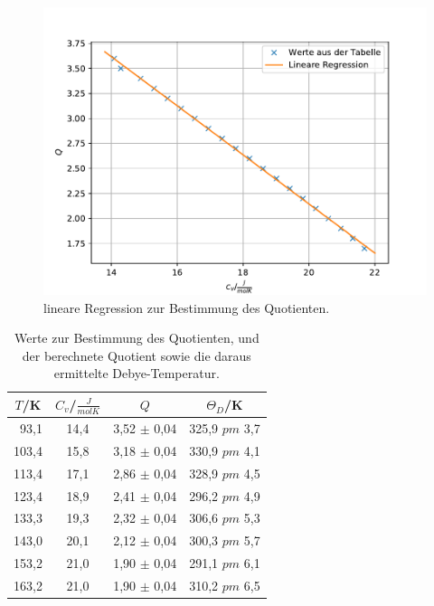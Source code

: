 \begin{figure}
  \centering
  \includegraphics{Q.pdf}
  \caption{lineare Regression zur Bestimmung des Quotienten.}
  \label{fig:Q}
\end{figure}
\FloatBarrier

\begin{table}
    \centering
    \caption{Werte zur Bestimmung des Quotienten, und der berechnete Quotient sowie die daraus ermittelte Debye-Temperatur.}
    \label{TabTd}
    \begin{tabular}{S S S[table-format=2.2] S } %
      \toprule
       {$T$/K} & {$C_{\si{v}}$/$\frac{\si{J}}{\si{molK}}$} & {$Q$} & {$\Theta_{\si{D}}$/K} \\
      \midrule
      \midrule
        {~93,1} & {14,4}& {3,52 $\pm$ 0,04} & {325,9 $pm$ 3,7} \\
        {103,4} & {15,8}& {3,18 $\pm$ 0,04} & {330,9 $pm$ 4,1} \\
        {113,4} & {17,1}& {2,86 $\pm$ 0,04} & {328,9 $pm$ 4,5} \\
        {123,4} & {18,9}& {2,41 $\pm$ 0,04} & {296,2 $pm$ 4,9} \\
        {133,3} & {19,3}& {2,32 $\pm$ 0,04} & {306,6 $pm$ 5,3} \\
        {143,0} & {20,1}& {2,12 $\pm$ 0,04} & {300,3 $pm$ 5,7} \\
        {153,2} & {21,0}& {1,90 $\pm$ 0,04} & {291,1 $pm$ 6,1} \\
        {163,2} & {21,0}& {1,90 $\pm$ 0,04} & {310,2 $pm$ 6,5} \\
      \bottomrule
    \end{tabular}
\end{table}
\FloatBarrier


